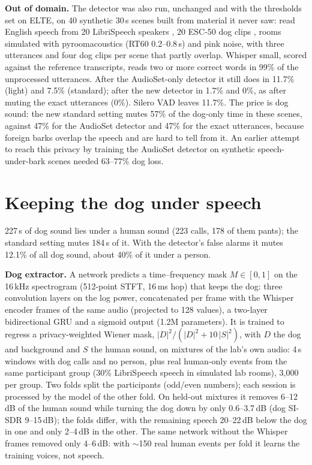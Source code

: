 \documentclass[10pt,twocolumn,a4paper]{article}
\begin{document}
\textbf{Out of domain.} The detector was also run, unchanged and with the thresholds set on ELTE, on
40 synthetic 30\,s scenes built from material it never saw: read English speech from 20 LibriSpeech
speakers \cite{panayotov2015librispeech}, 20 ESC-50 dog clips \cite{piczak2015esc}, rooms simulated with
pyroomacoustics \cite{scheibler2018pyroomacoustics} (RT60 0.2--0.8\,s) and pink noise, with three
utterances and four dog clips per scene that partly overlap. Whisper small, scored against the reference
transcripts, reads two or more correct words in 99\% of the unprocessed utterances. After the AudioSet-only
detector it still does in 11.7\% (light) and 7.5\% (standard); after the new detector in 1.7\% and 0\%,
as after muting the exact utterances (0\%). Silero VAD \cite{silero} leaves 11.7\%. The price is dog
sound: the new standard setting mutes 57\% of the dog-only time in these scenes, against 47\% for the
AudioSet detector and 47\% for the exact utterances, because foreign barks overlap the speech and are
hard to tell from it. An earlier attempt to reach this privacy by training the AudioSet detector on
synthetic speech-under-bark scenes needed 63--77\% dog loss.

\section{Keeping the dog under speech}
\label{sec:keep}
227\,s of dog sound lies under a human sound (223 calls, 178 of them pants); the standard setting mutes
184\,s of it. With the detector's false alarms it mutes 12.1\% of all dog sound, about 40\% of it under a
person.

\textbf{Dog extractor.} A network predicts a time--frequency mask $M\in[0,1]$ on the 16\,kHz
spectrogram (512-point STFT, 16\,ms hop) that keeps the dog: three convolution layers on the log power,
concatenated per frame with the Whisper encoder frames of the same audio (projected to 128 values), a
two-layer bidirectional GRU and a sigmoid output (1.2M parameters). It is trained to regress a
privacy-weighted Wiener mask, $|D|^2/(|D|^2+10\,|S|^2)$, with $D$ the dog and background and $S$ the human
sound, on mixtures of the lab's own audio: 4\,s windows with dog calls and no person, plus real
human-only events from the same participant group (30\% LibriSpeech speech in simulated lab rooms),
3{,}000 per group. Two folds split the participants (odd/even numbers); each session is processed by the
model of the other fold. On held-out mixtures it removes 6--12\,dB of the human sound while turning the
dog down by only 0.6--3.7\,dB (dog SI-SDR 9--15\,dB); the folds differ, with the remaining speech
20--22\,dB below the dog in one and only 2--4\,dB in the other. The same network without the Whisper frames removed
only 4--6\,dB: with $\sim$150 real human events per fold it learns the training voices, not speech.
\end{document}
